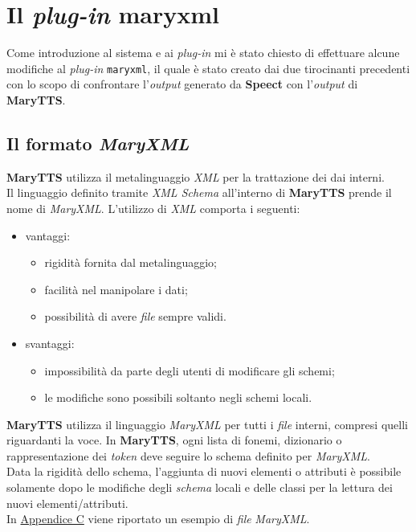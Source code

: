 
\section{Il \textit{plug-in} maryxml}
Come introduzione al sistema e ai \textit{plug-in} mi è stato chiesto di effettuare alcune modifiche
al \textit{plug-in} \texttt{maryxml}, il quale è stato creato dai due tirocinanti precedenti con lo scopo
di confrontare l'\textit{output} generato da \textbf{Speect} con l'\textit{output} di \textbf{MaryTTS}.
   \subsection{Il formato \textit{MaryXML}}
      \textbf{MaryTTS} utilizza il metalinguaggio \textit{XML} per la trattazione dei dai interni. \\
             Il linguaggio definito tramite \textit{XML Schema} all'interno di \textbf{MaryTTS} prende il nome
             di \textit{MaryXML}. L'utilizzo di \textit{XML} comporta i seguenti:
                  \begin{itemize}
                    \item vantaggi:
                         \begin{itemize}
                            \item rigidità fornita dal metalinguaggio;
                            \item facilità nel manipolare i dati;
                            \item possibilità di avere \textit{file} sempre validi.
                         \end{itemize}
                    \item svantaggi:
                         \begin{itemize}
                           \item impossibilità da parte degli utenti di modificare gli schemi;
                           \item le modifiche sono possibili soltanto negli schemi locali.
                         \end{itemize}
                  \end{itemize}
                  \textbf{MaryTTS} utilizza il linguaggio \textit{MaryXML} per tutti i \textit{file} interni,
                  compresi quelli riguardanti la voce. In \textbf{MaryTTS}, ogni lista di fonemi, dizionario o rappresentazione
                  dei \textit{token} deve seguire lo schema definito per \textit{MaryXML}. \\ Data la rigidità dello schema, l'aggiunta
                  di nuovi elementi o attributi è possibile solamente dopo le modifiche degli \textit{schema} locali 
                  e delle classi per la lettura dei nuovi elementi/attributi. \\
                  In \hyperref[app:appc]{Appendice C} viene riportato un esempio di \textit{file} \textit{MaryXML}.
